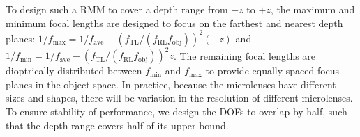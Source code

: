 \documentclass{osa-article}
\begin{document}
To design such a RMM to cover a depth range from $- z$ to $+ z$, the maximum and minimum focal lengths are designed to focus on the farthest and nearest depth planes: $1/f_{\mathrm{max}} = 1/f_{\mathrm{ave}} - (f_\mathrm{TL}/(f_\mathrm{RL} f_\mathrm{obj}))^2 (- z)$ and $1/f_{\mathrm{min}} = 1/f_{\mathrm{ave}} - (f_\mathrm{TL}/(f_\mathrm{RL} f_\mathrm{obj}))^2 z$. The remaining focal lengths are dioptrically distributed between $f_\mathrm{min}$ and $f_\mathrm{max}$ to provide equally-spaced focus planes in the object space. In practice, because the microlenses have different sizes and shapes, there will be variation in the resolution of different microlenses. To ensure stability of performance, we design the DOFs to overlap by half, such that the depth range covers half of its upper bound.


\end{document}
